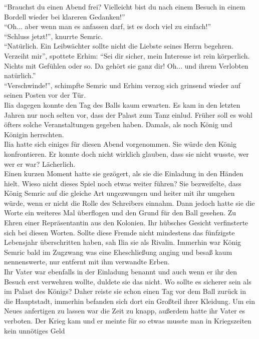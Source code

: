 ``Brauchst du einen Abend frei? Vielleicht bist du nach einem Besuch in einem Bordell wieder bei 
klareren Gedanken!''\\
``Oh... aber wenn man es anfassen darf, ist es doch viel zu einfach!''\\
``Schluss jetzt!'', knurrte Semric.\\
``Natürlich. Ein Leibwächter sollte nicht die Liebste seines Herrn begehren. Verzeiht mir'', 
spottete Erhim: ``Sei dir sicher, mein Interesse ist rein körperlich. Nichts mit Gefühlen oder so. 
Da gehört sie ganz dir! Oh... und ihrem Verlobten natürlich.''\\
``Verschwinde!'', schimpfte Semric und Erhim verzog sich grinsend wieder auf seinen Posten vor der 
Tür.\\

Ilia dagegen konnte den Tag des Balls kaum erwarten. Es kam in den letzten Jahren nur noch selten 
vor, dass der Palast zum Tanz einlud. Früher soll es wohl öfters solche Veranstaltungen gegeben 
haben. Damals, als noch König und Königin herrschten.\\
Ilia hatte sich einiges für diesen Abend vorgenommen. Sie würde den König konfrontieren. Er konnte 
doch nicht wirklich glauben, dass sie nicht wusste, wer wer er war? Lächerlich.\\
Einen kurzen Moment hatte sie gezögert, als sie die Einladung in den Händen hielt. Wieso nicht 
dieses Spiel noch etwas weiter führen? Sie bezweifelte, dass König Semric auf die gleiche Art 
ungezwungen und heiter mit ihr umgehen würde, wenn er nicht die Rolle des Schreibers einnahm. Dann 
jedoch hatte sie die Worte ein weiteres Mal überflogen und den Grund für den Ball gesehen. Zu Ehren 
einer Repräsentantin aus den Kolonien. Ihr hübsches Gesicht verfinsterte sich bei diesen Worten. 
Sollte diese Fremde nicht mindestens das fünfzigste Lebensjahr überschritten haben, sah Ilia sie 
als Rivalin. Immerhin war König Semric bald im Zugzwang was eine Eheschließung anging und besaß 
kaum nennenswerte, nur entfernt mit ihm verwandte Erben.\\
Ihr Vater war ebenfalls in der Einladung benannt und auch wenn er ihr den Besuch erst verwehren 
wollte, duldete sie das nicht. Wo sollte es sicherer sein als im Palast des Königs? Daher reiste sie 
schon einen Tag vor dem Ball zurück in die Hauptstadt, immerhin befanden sich dort ein Großteil 
ihrer Kleidung. Um ein Neues anfertigen zu lassen war die Zeit zu knapp, außerdem hatte ihr Vater es 
verboten. Der Krieg kam und er meinte für so etwas musste man in Kriegszeiten kein unnötiges Geld 
